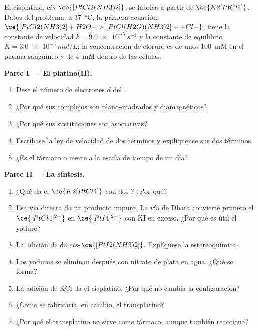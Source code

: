 \begin{problem}
\label{pb:b3:complex-mechanisms:1}
El cisplatino, $cis$-$\ce{[PtCl2(NH3)2]}$, se fabrica a partir de $\ce{K2[PtCl4]}$. Datos del problema: a
\qty{37}{\celsius}, la primera acuación, $\ce{[PtCl2(NH3)2] + H2O -> [PtCl(H2O)(NH3)2]+ + Cl-}$, tiene la
constante de velocidad $k = \qty{9.0e-5}{s^{-1}}$ y la constante de equilibrio $K = \qty{3.0e-3}{mol/L}$; la
concentración de cloruro es de unos \qty{100}{mM} en el plasma sanguíneo y de \qty{4}{mM} dentro de las células.

\medskip\noindent\textbf{Parte I --- El platino(II).}
\begin{enumerate}
  \item Dese el número de electrones $d$ del .
  \item ¿Por qué sus complejos son plano-cuadrados y diamagnéticos?
  \item ¿Por qué sus sustituciones son asociativas?
  \item Escríbase la ley de velocidad de dos términos y explíquense sus dos términos.
  \item ¿Es el fármaco  o inerte a la escala de tiempo de un día?
\end{enumerate}

\medskip\noindent\textbf{Parte II --- La síntesis.}
\begin{enumerate}[resume]
  \item ¿Qué da el $\ce{K2[PtCl4]}$ con dos ? ¿Por qué?
  \item Esa vía directa da un producto impuro. La vía de Dhara convierte primero
        el $\ce{[PtCl4]^{2-}}$ en $\ce{[PtI4]^{2-}}$ con KI en exceso. ¿Por qué es útil el yoduro?
  \item La adición de  da $cis$-$\ce{[PtI2(NH3)2]}$. Explíquese la estereoquímica.
  \item Los yoduros se eliminan después con nitrato de plata en agua. ¿Qué se forma?
  \item La adición de KCl da el cisplatino. ¿Por qué no cambia la configuración?
  \item ¿Cómo se fabricaría, en cambio, el transplatino?
  \item ¿Por qué el transplatino no sirve como fármaco, aunque también reacciona?
\end{enumerate}


\end{problem}
